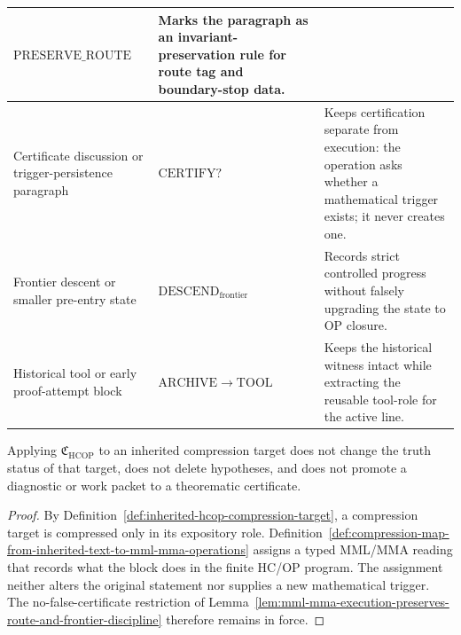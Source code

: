 \begin{definition}
{\begin{longtable}{|P{0.28\textwidth}|P{0.24\textwidth}|P{0.36\textwidth}|}
\(\mathrm{PRESERVE\_ROUTE}\) &
Marks the paragraph as an invariant-preservation rule for route tag and boundary-stop data. \\
\hline
Certificate discussion or trigger-persistence paragraph &
\(\mathrm{CERTIFY?}\) &
Keeps certification separate from execution: the operation asks whether a mathematical trigger exists; it never creates one. \\
\hline
Frontier descent or smaller pre-entry state &
\(\mathrm{DESCEND}_{\mathrm{frontier}}\) &
Records strict controlled progress without falsely upgrading the state to OP closure. \\
\hline
Historical tool or early proof-attempt block &
\(\mathrm{ARCHIVE}\to\mathrm{TOOL}\) &
Keeps the historical witness intact while extracting the reusable tool-role for the active line. \\
\hline
\end{longtable}
}
\end{definition}

\begin{lemma}
\label{lem:compression-map-preserves-proof-content}
Applying \(\mathfrak C_{\mathrm{HCOP}}\) to an inherited compression target does not change the truth status of that target, does not delete hypotheses, and does not promote a diagnostic or work packet to a theorematic certificate.
\end{lemma}

\begin{proof}
By Definition~\ref{def:inherited-hcop-compression-target}, a compression target is compressed only in its expository role. Definition~\ref{def:compression-map-from-inherited-text-to-mml-mma-operations} assigns a typed MML/MMA reading that records what the block does in the finite HC/OP program. The assignment neither alters the original statement nor supplies a new mathematical trigger. The no-false-certificate restriction of Lemma~\ref{lem:mml-mma-execution-preserves-route-and-frontier-discipline} therefore remains in force.
\end{proof}

